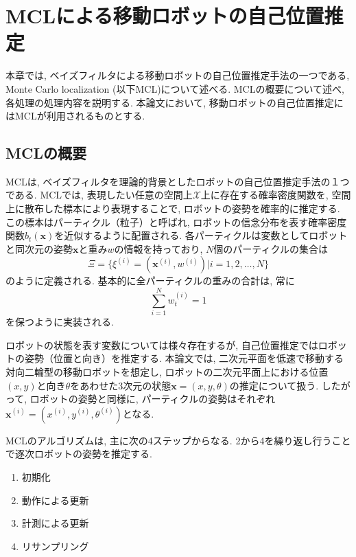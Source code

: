 \chapter{MCLによる移動ロボットの自己位置推定} \label{chapter:localization}

本章では, ベイズフィルタによる移動ロボットの自己位置推定手法の一つである, Monte Carlo localization (以下MCL)について述べる. 
MCLの概要について述べ, 各処理の処理内容を説明する. 
本論文において, 移動ロボットの自己位置推定にはMCLが利用されるものとする. 


\section{MCLの概要}

MCLは, ベイズフィルタを理論的背景としたロボットの自己位置推定手法の１つである. 
MCLでは, 表現したい任意の空間上$\mathcal{X}$上に存在する確率密度関数を, 空間上に散布した標本により表現することで, ロボットの姿勢を確率的に推定する. 
この標本はパーティクル（粒子）と呼ばれ, ロボットの信念分布を表す確率密度関数$b_t(\bm{x})$を近似するように配置される. 
各パーティクルは変数としてロボットと同次元の姿勢$\bm{x}$と重み$w$の情報を持っており, $N$個のパーティクルの集合は
\begin{equation}
\label{particles}
  \Xi = \{ \xi^{(i)} = (\bm{x}^{(i)}, w^{(i)}) |i = 1,2,\dots,N \}
\end{equation}
のように定義される. 
基本的に全パーティクルの重みの合計は, 常に
\begin{equation}
\label{weight_sum}
  \sum_{i=1}^{N}w^{(i)}_{t}=1
\end{equation}
を保つように実装される. 

ロボットの状態を表す変数については様々存在するが, 自己位置推定ではロボットの姿勢（位置と向き）を推定する. 
本論文では, 二次元平面を低速で移動する対向二輪型の移動ロボットを想定し, ロボットの二次元平面上における位置$(x, y)$と向き$\theta$をあわせた3次元の状態$\bm{x} = (x, y, \theta)$の推定について扱う. 
したがって, ロボットの姿勢と同様に, パーティクルの姿勢はそれぞれ$\bm{x}^{(i)} = (x^{(i)}, y^{(i)}, \theta^{(i)})$となる. 

MCLのアルゴリズムは, 主に次の4ステップからなる. 
2から4を繰り返し行うことで逐次ロボットの姿勢を推定する. 
\begin{enumerate}
  \item 初期化
  \item 動作による更新
  \item 計測による更新
  \item リサンプリング
\end{enumerate}


